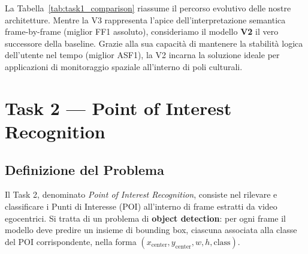 \documentclass[a4paper,12pt]{report}
\begin{document}
La Tabella~\ref{tab:task1_comparison} riassume il percorso evolutivo delle nostre architetture. Mentre la V3 rappresenta l'apice dell'interpretazione semantica frame-by-frame (miglior FF1 assoluto), consideriamo il modello \textbf{V2} il vero successore della baseline. Grazie alla sua capacità di mantenere la stabilità logica dell'utente nel tempo (miglior ASF1), la V2 incarna la soluzione ideale per applicazioni di monitoraggio spaziale all'interno di poli culturali.

\begin{table}[htbp]
\centering
\caption{Confronto riassuntivo delle performance (Palazzo Bellomo) tra la baseline del paper e le tre iterazioni architetturali proposte nel nostro studio.}
\label{tab:task1_comparison}
\end{table}


\chapter{Task 2 --- Point of Interest Recognition}

\section{Definizione del Problema}

Il Task 2, denominato \emph{Point of Interest Recognition}, consiste nel rilevare e classificare i Punti di Interesse (POI) all'interno di frame estratti da video egocentrici. 
Si tratta di un problema di \textbf{object detection}: per ogni frame il modello deve predire un insieme di bounding box, ciascuna associata alla classe del POI corrispondente, nella forma $(x_{\text{center}}, y_{\text{center}}, w, h, \text{class})$.
\end{document}
